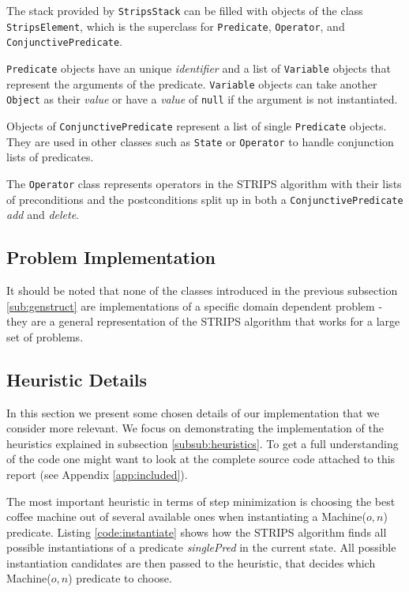 The stack provided by \texttt{StripsStack} can be filled with objects of the class \texttt{StripsElement}, which is the superclass for \texttt{Predicate}, \texttt{Operator}, and \texttt{ConjunctivePredicate}. 

\texttt{Predicate} objects have an unique \textit{identifier} and a list of \texttt{Variable} objects that represent the arguments of the predicate. \texttt{Variable} objects can take another \texttt{Object} as their \textit{value} or have a \textit{value} of \texttt{null} if the argument is not instantiated. 

Objects of \texttt{ConjunctivePredicate} represent a list of single \texttt{Predicate} objects. They are used in other classes such as \texttt{State} or \texttt{Operator} to handle conjunction lists of predicates.

The \texttt{Operator} class represents operators in the STRIPS algorithm with their lists of preconditions and the postconditions split up in both a \texttt{ConjunctivePredicate} \textit{add} and \textit{delete}.


\subsection{Problem Implementation}

It should be noted that none of the classes introduced in the previous subsection \ref{sub:genstruct} are implementations of a specific domain dependent problem - they are a general representation of the STRIPS algorithm that works for a large set of problems.


\subsection{Heuristic Details}

In this section we present some chosen details of our implementation that we consider more relevant. We focus on demonstrating the implementation of the heuristics explained in subsection \ref{subsub:heuristics}. To get a full understanding of the code one might want to look at the complete source code attached to this report (see Appendix \ref{app:included}).

The most important heuristic in terms of step minimization is choosing the best coffee machine out of several available ones when instantiating a Machine($o, n$) predicate. Listing \ref{code:instantiate} shows how the STRIPS algorithm finds all possible instantiations of a predicate \textit{singlePred} in the current state. All possible instantiation candidates are then passed to the heuristic, that decides which Machine($o, n$) predicate to choose. 


